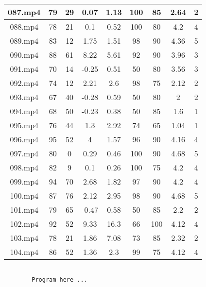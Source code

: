 \begin{enumerate}
\begin{longtable}{|c|c|c|c|c|c|c|c|c|}
		087.mp4 & 79      & 29      & 0.07    & 1.13      & 100         & 85          & 2.64 & 2     \\ \hline
		088.mp4 & 78      & 21      & 0.1     & 0.52      & 100         & 80          & 4.2  & 4     \\ \hline
		089.mp4 & 83      & 12      & 1.75    & 1.51      & 98          & 90          & 4.36 & 5     \\ \hline
		090.mp4 & 88      & 61      & 8.22    & 5.61      & 92          & 90          & 3.96 & 3     \\ \hline
		091.mp4 & 70      & 14      & -0.25   & 0.51      & 50          & 80          & 3.56 & 3     \\ \hline
		092.mp4 & 74      & 12      & 2.21    & 2.6       & 98          & 75          & 2.12 & 2     \\ \hline
		093.mp4 & 67      & 40      & -0.28   & 0.59      & 50          & 80          & 2    & 2     \\ \hline
		094.mp4 & 68      & 50      & -0.23   & 0.38      & 50          & 85          & 1.6  & 1     \\ \hline
		095.mp4 & 76      & 44      & 1.3     & 2.92      & 74          & 65          & 1.04 & 1     \\ \hline
		096.mp4 & 95      & 52      & 4       & 1.57      & 96          & 90          & 4.16 & 4     \\ \hline
		097.mp4 & 80      & 0       & 0.29    & 0.46      & 100         & 90          & 4.68 & 5     \\ \hline
		098.mp4 & 82      & 9       & 0.1     & 0.26      & 100         & 75          & 4.2  & 4     \\ \hline
		099.mp4 & 94      & 70      & 2.68    & 1.82      & 97          & 90          & 4.2  & 4     \\ \hline
		100.mp4 & 87      & 76      & 2.12    & 2.95      & 98          & 90          & 4.68 & 5     \\ \hline
		101.mp4 & 79      & 65      & -0.47   & 0.58      & 50          & 85          & 2.2  & 2     \\ \hline
		102.mp4 & 92      & 52      & 9.33    & 16.3      & 66          & 100         & 4.12 & 4     \\ \hline
		103.mp4 & 78      & 21      & 1.86    & 7.08      & 73          & 85          & 2.32 & 2     \\ \hline
		104.mp4 & 86      & 52      & 1.36    & 2.3       & 99          & 75          & 4.12 & 4     \\ \hline
	\end{longtable}

	
	\begin{verbatim}
		
		Program here ...
		
	\end{verbatim}

\end{enumerate}